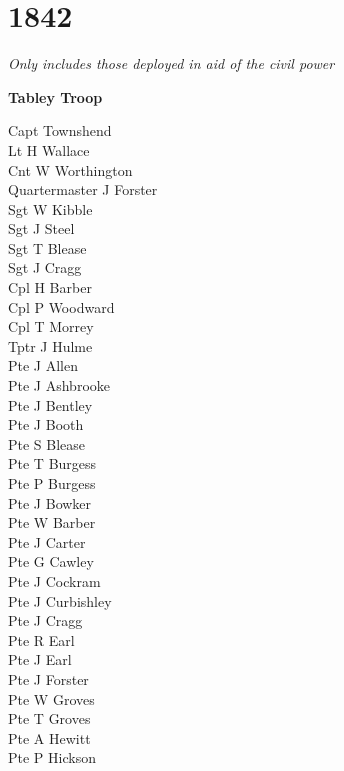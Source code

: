 \chapter*{1842}

\begin{center}
  \textit{Only includes those deployed in aid of the civil power}
\end{center}

\begin{center}
  \Large
  \textbf{Tabley Troop}
\end{center}

\begin{multicols}{2}
  \noindent
  Capt Townshend \\
  Lt H Wallace \\
  Cnt W Worthington \\
  Quartermaster J Forster \\
  Sgt W Kibble \\
  Sgt J Steel \\
  Sgt T Blease \\
  Sgt J Cragg \\
  Cpl H Barber \\
  Cpl P Woodward \\
  Cpl T Morrey \\
  Tptr J Hulme \\
  Pte J Allen \\
  Pte J Ashbrooke \\
  Pte J Bentley \\
  Pte J Booth \\
  Pte S Blease \\
  Pte T Burgess \\
  Pte P Burgess \\
  Pte J Bowker \\
  Pte W Barber \\
  Pte J Carter \\
  Pte G Cawley \\
  Pte J Cockram \\
  Pte J Curbishley \\
  Pte J Cragg \\
  Pte R Earl \\
  Pte J Earl \\
  Pte J Forster \\
  Pte W Groves \\
  Pte T Groves \\
  Pte A Hewitt \\
  Pte P Hickson \\

\end{multicols}
